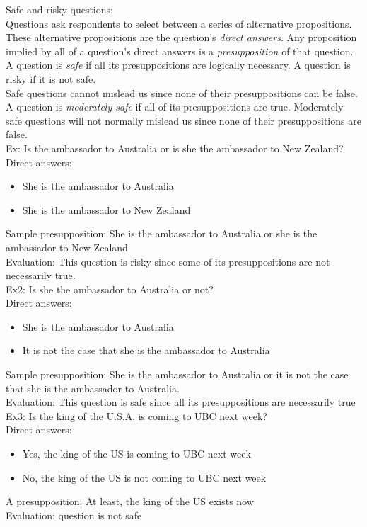 \documentclass[11pt, fleqn]{article}
\begin{document}
Safe and risky questions:\\
Questions ask respondents to select between a series of alternative propositions. These alternative propositions are the question's \textit{direct answers}. Any proposition implied by all of a question's direct answers is a \textit{presupposition} of that question. A question is \textit{safe} if all its presuppositions are logically necessary. A question is risky if it is not safe.\\
Safe questions cannot mislead us since none of their presuppositions can be false. A question is \textit{moderately safe} if all of its presuppositions are true. Moderately safe questions will not normally mislead us since none of their presuppositions are false.\\

Ex: Is the ambassador to Australia or is she the ambassador to New Zealand?\\
Direct answers:
\begin{itemize}
    \item She is the ambassador to Australia
    \item She is the ambassador to New Zealand
\end{itemize}
Sample presupposition: She is the ambassador to Australia or she is the ambassador to New Zealand\\
Evaluation: This question is risky since some of its presuppositions are not necessarily true.\\

Ex2: Is she the ambassador to Australia or not?\\
Direct answers:
\begin{itemize}
    \item She is the ambassador to Australia
    \item It is not the case that she is the ambassador to Australia
\end{itemize}
Sample presupposition: She is the ambassador to Australia or it is not the case that she is the ambassador to Australia.\\
Evaluation: This question is safe since all its presuppositions are necessarily true\\

Ex3: Is the king of the U.S.A. is coming to UBC next week?\\
Direct answers:
\begin{itemize}
    \item Yes, the king of the US is coming to UBC next week
    \item No, the king of the US is not coming to UBC next week
\end{itemize}
A presupposition: At least, the king of the US exists now\\
Evaluation: question is not safe\\
\end{document}
